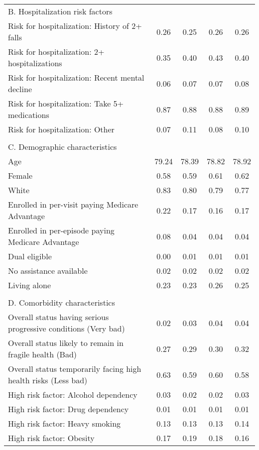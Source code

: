 \documentclass[final,12pt]{article}
\begin{document}
\begin{singlespace}
\begin{table}[H]
\begin{threeparttable}
\begin{tabular}{l*{4}c}
\\
\multicolumn{5}{l}{B. Hospitalization risk factors}\\
Risk for hospitalization: History of 2+ falls & 0.26  & 0.25  & 0.26  & 0.26 \\
Risk for hospitalization: 2+ hospitalizations & 0.35  & 0.40  & 0.43  & 0.40 \\
Risk for hospitalization: Recent mental decline & 0.06  & 0.07  & 0.07  & 0.08 \\
Risk for hospitalization: Take 5+ medications & 0.87  & 0.88  & 0.88  & 0.89 \\
Risk for hospitalization: Other & 0.07  & 0.11  & 0.08  & 0.10 \\

\\
\multicolumn{5}{l}{C. Demographic characteristics}\\
Age & 79.24  & 78.39  & 78.82  & 78.92 \\
Female & 0.58  & 0.59  & 0.61  & 0.62 \\
White & 0.83  & 0.80  & 0.79  & 0.77 \\
Enrolled in per-visit paying Medicare Advantage & 0.22  & 0.17  & 0.16  & 0.17 \\
Enrolled in per-episode paying Medicare Advantage & 0.08  & 0.04  & 0.04  & 0.04 \\
Dual eligible & 0.00  & 0.01  & 0.01  & 0.01 \\
No assistance available & 0.02  & 0.02  & 0.02  & 0.02 \\
Living alone & 0.23  & 0.23  & 0.26  & 0.25 \\
\\
\multicolumn{5}{l}{D. Comorbidity characteristics}\\
Overall status having serious progressive conditions (Very bad) & 0.02  & 0.03  & 0.04  & 0.04 \\
Overall status likely to remain in fragile health (Bad) & 0.27  & 0.29  & 0.30  & 0.32 \\
Overall status temporarily facing high health risks (Less bad) & 0.63  & 0.59  & 0.60  & 0.58 \\
High risk factor: Alcohol dependency & 0.03  & 0.02  & 0.02  & 0.03 \\
High risk factor: Drug dependency & 0.01  & 0.01  & 0.01  & 0.01 \\
High risk factor: Heavy smoking & 0.13  & 0.13  & 0.13  & 0.14 \\
High risk factor: Obesity & 0.17  & 0.19  & 0.18  & 0.16 \\

\end{tabular}
\end{threeparttable}
\end{table}
\end{singlespace}
\end{document}
